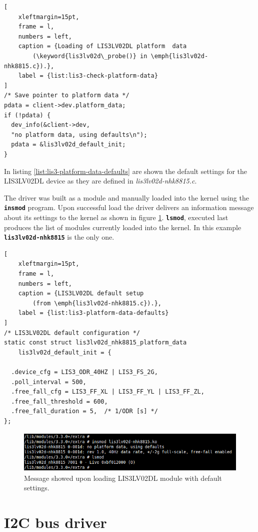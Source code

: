 \documentclass[a4paper,10pt]{article}
\newcommand{\keyword}[1]{\texttt{\textbf{#1}}}
\begin{document}
\begin{multicols}{2}
\begin{lstlisting}[
	xleftmargin=15pt,
	frame = l,
	numbers = left,
	caption = {Loading of LIS3LV02DL platform  data
		(\keyword{lis3lv02d\_probe()} in \emph{lis3lv02d-nhk8815.c}).},
	label = {list:lis3-check-platform-data}
]
/* Save pointer to platform data */
pdata = client->dev.platform_data;
if (!pdata) {
  dev_info(&client->dev,
  "no platform data, using defaults\n");
  pdata = &lis3lv02d_default_init;
}
\end{lstlisting}

In listing \ref{list:lis3-platform-data-defaults} are shown the default settings
for the LIS3LV02DL device as they are defined in \emph{lis3lv02d-nhk8815.c}.

The driver was built as a module and manually loaded into the kernel using the
\keyword{insmod} program. Upon successful load the driver delivers an information
message about its settings to the kernel as shown in figure \ref{fig:lis3-insmod}.
\keyword{lsmod}, executed last produces the list of modules currently loaded into
the kernel. In this example \keyword{lis3lv02d-nhk8815} is the only one.

\begin{lstlisting}[
	xleftmargin=15pt,
	frame = l,
	numbers = left,
	caption = {LIS3LV02DL default setup
		(from \emph{lis3lv02d-nhk8815.c}).},
	label = {list:lis3-platform-data-defaults}
]
/* LIS3LV02DL default configuration */
static const struct lis3lv02d_nhk8815_platform_data
	lis3lv02d_default_init = {

  .device_cfg = LIS3_ODR_40HZ | LIS3_FS_2G,
  .poll_interval = 500,
  .free_fall_cfg = LIS3_FF_XL | LIS3_FF_YL | LIS3_FF_ZL,
  .free_fall_threshold = 600,
  .free_fall_duration = 5,	/* 1/ODR [s] */
};
\end{lstlisting}

\begin{figure}
 \includegraphics[width=11.7cm, height=2cm]{./figures/lis3lv02d-insmod.png}
 \caption{Message showed upon loading LIS3LV02DL module with default settings.}
 \label{fig:lis3-insmod}
\end{figure}



\section{I2C bus driver}
\label{sec:i2c_bus_driver}


\end{multicols}
\end{document}
